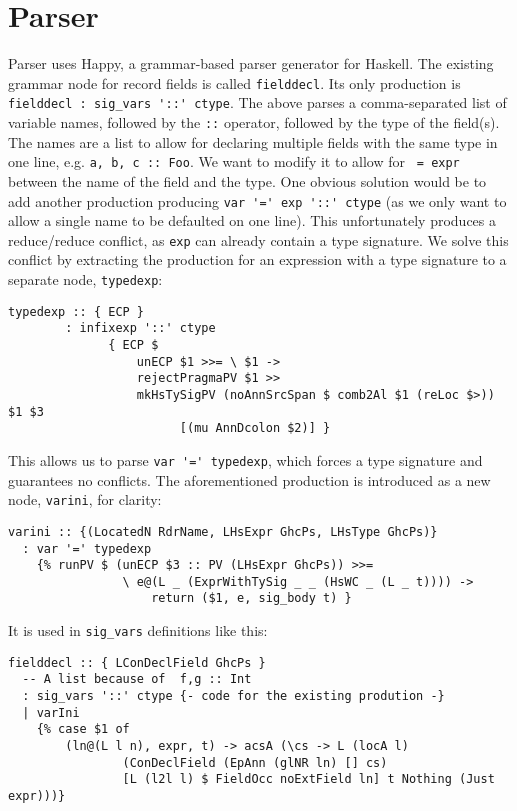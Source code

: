 \documentclass[en]{pracamgr}
\newcommand{\code}[1]{\lstinline[breaklines=true]{#1}}
\begin{document}
\section{Parser}\label{impl:parser}
Parser uses Happy, a grammar-based parser generator for Haskell.
The existing grammar node for record fields is called \code{fielddecl}.
Its only production is \lstinline[breaklines=true]{fielddecl : sig_vars '::' ctype}.
The above parses a comma-separated list of variable names, followed by the \code{::} operator, followed by the type of the field(s).
The names are a list to allow for declaring multiple fields with the same type in one line, e.g. \code{a, b, c :: Foo}.
We want to modify it to allow for \code{ = expr} between the name of the field and the type.
One obvious solution would be to add another production producing \code{var '=' exp '::' ctype} (as we only want to allow a single name to be defaulted on one line).
This unfortunately produces a reduce/reduce conflict, as \code{exp} can already contain a type signature. 
We solve this conflict by extracting the production for an expression with a type signature to a separate node, \code{typedexp}:

\begin{lstlisting}
typedexp :: { ECP }
        : infixexp '::' ctype
              { ECP $
                  unECP $1 >>= \ $1 ->
                  rejectPragmaPV $1 >>
                  mkHsTySigPV (noAnnSrcSpan $ comb2Al $1 (reLoc $>)) $1 $3
                        [(mu AnnDcolon $2)] }

\end{lstlisting}

This allows us to parse \code{var '=' typedexp}, which forces a type signature and guarantees no conflicts.
The aforementioned production is introduced as a new node, \code{varini}, for clarity:
\begin{lstlisting}
varini :: {(LocatedN RdrName, LHsExpr GhcPs, LHsType GhcPs)}
  : var '=' typedexp
    {% runPV $ (unECP $3 :: PV (LHsExpr GhcPs)) >>=
                \ e@(L _ (ExprWithTySig _ _ (HsWC _ (L _ t)))) -> 
                    return ($1, e, sig_body t) }
\end{lstlisting}
It is used in \code{sig_vars} definitions like this:
\begin{lstlisting}
fielddecl :: { LConDeclField GhcPs }
  -- A list because of  f,g :: Int
  : sig_vars '::' ctype {- code for the existing prodution -}
  | varIni
    {% case $1 of
        (ln@(L l n), expr, t) -> acsA (\cs -> L (locA l) 
                (ConDeclField (EpAnn (glNR ln) [] cs)
                [L (l2l l) $ FieldOcc noExtField ln] t Nothing (Just expr)))}
\end{lstlisting}
\end{document}
